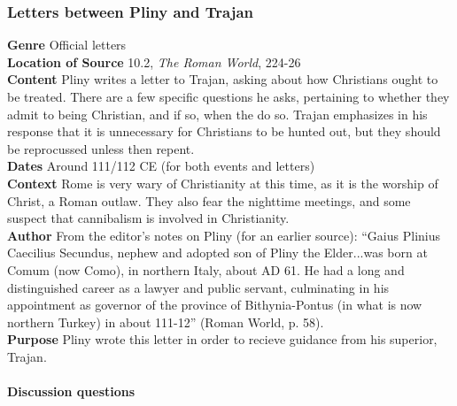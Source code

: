 \documentclass{article}
\begin{document}
\subsubsection*{Letters between Pliny and Trajan}
\textbf{Genre}
Official letters \\
\textbf{Location of Source}
10.2, \textit{The Roman World}, 224-26 \\
\textbf{Content}
Pliny writes a letter to Trajan, asking about how Christians ought to be treated. There are a
few specific questions he asks, pertaining to whether they admit to being Christian, and if so,
when the do so. Trajan emphasizes in his response that it is unnecessary for Christians to be
hunted out, but they should be reprocussed unless then repent.\\
\textbf{Dates}
Around 111/112 CE (for both events and letters) \\
\textbf{Context}
Rome is very wary of Christianity at this time, as it is the worship of Christ, a Roman outlaw.
They also fear the nighttime meetings, and some suspect that cannibalism is involved in
Christianity. \\
\textbf{Author}
From the editor’s notes on Pliny (for an earlier source): “Gaius Plinius Caecilius Secundus,
nephew and adopted son of Pliny the Elder...was born at Comum (now Como), in northern
Italy, about AD 61.  He had a long and distinguished career as a lawyer and public servant,
culminating in his appointment as governor of the province of Bithynia-Pontus (in what is
now northern Turkey) in about 111-12” (Roman World, p. 58). \\
\textbf{Purpose}
Pliny wrote this letter in order to recieve guidance from his superior, Trajan. \\
\\
\textbf{Discussion questions}
\end{document}
